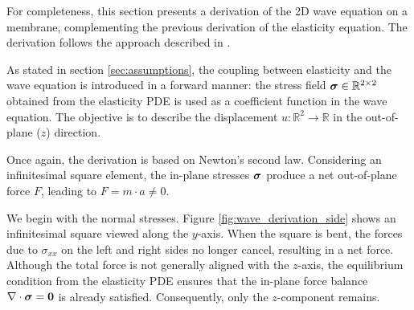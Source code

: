 For completeness, this section presents a derivation of the 2D wave equation on a membrane, complementing the previous derivation of the elasticity equation. The derivation follows the approach described in \cite{ClelandAndrewN2003Fon:}.  

As stated in section \ref{sec:assumptions}, the coupling between elasticity and the wave equation is introduced in a forward manner: the stress field $\boldsymbol{\sigma} \in \mathbb{R}^{2\times 2}$ obtained from the elasticity PDE is used as a coefficient function in the wave equation. The objective is to describe the displacement $u:\mathbb{R}^2 \rightarrow \mathbb{R}$ in the out-of-plane ($z$) direction.  

Once again, the derivation is based on Newton’s second law. Considering an infinitesimal square element, the in-plane stresses $\boldsymbol{\sigma}$ produce a net out-of-plane force $F$, leading to $F = m \cdot a \neq 0$.  

We begin with the normal stresses. Figure \ref{fig:wave_derivation_side} shows an infinitesimal square viewed along the $y$-axis. When the square is bent, the forces due to $\sigma_{xx}$ on the left and right sides no longer cancel, resulting in a net force. Although the total force is not generally aligned with the $z$-axis, the equilibrium condition from the elasticity PDE ensures that the in-plane force balance $\nabla \cdot \boldsymbol{\sigma} = \mathbf{0}$ is already satisfied. Consequently, only the $z$-component remains.  

